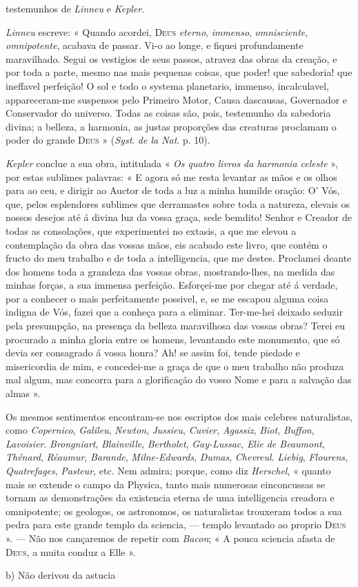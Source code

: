 testemunhos de \emph{Linneu} e \emph{Kepler}.\par \emph{Linneu} escreve: « Quando acordei, \textsc{Deus} \emph{eterno}, \emph{immenso}, \emph{omnisciente}, \emph{omnipotente}, acabava de passar. Vi-o ao longe, e fiquei profundamente maravilhado. Segui os vestigios de seus passos, atravez das obras da creação, e por toda a parte, mesmo nas mais pequenas coisas, que poder! que sabedoria! que ineffavel perfeição! O sol e todo o systema planetario, immenso, incalculavel, appareceram-me suspensos pelo Primeiro Motor, Causa dascausas, Governador e Conservador do universo. Todas as coisas são, pois, testemunho da sabedoria divina; a belleza, a harmonia, as justas proporções das creaturas proclamam o poder do grande \textsc{Deus} » (\emph{Syst}. \emph{de la Nat}. p. 10).\par \emph{Kepler} conclue a sua obra, intitulada « \emph{Os quatro livros da harmonia celeste} », por estas sublimes palavras: « E agora só me resta levantar as mãos e os olhos para ao ceu, e dirigir ao Auctor de toda a luz a minha humilde oração: O' Vós, que, pelos esplendores sublimes que derramastes sobre toda a natureza, elevais os nossos desejos até á divina luz da vossa graça, sede bemdito! Senhor e Creador de todas as consolações, que experimentei no extasis, a que me elevou a contemplação da obra das vossas mãos, eis acabado este livro, que contém o fructo do meu trabalho e de toda a intelligencia, que me destes. Proclamei deante dos homens toda a grandeza das vossas obras, mostrando-lhes, na medida das minhas forças, a sua immensa perfeição. Esforçei-me por chegar até á verdade, por a conhecer o mais perfeitamente possivel, e, se me escapou alguma coisa indigna de Vós, fazei que a conheça para a eliminar. Ter-me-hei deixado seduzir pela presumpção, na presença da belleza maravilhosa das vossas obras? Terei eu procurado a minha gloria entre os homens, levantando este monumento, que só devia ser consagrado á vossa honra? Ah! se assim foi, tende piedade e misericordia de mim, e concedei-me a graça de que o meu trabalho não produza mal algum, mas concorra para a glorificação do vosso Nome e para a salvação das almas ».\par Os mesmos sentimentos encontram-se nos escriptos dos mais celebres naturalistas, como \emph{Copernico}, \emph{Galileu}, \emph{Newton}, \emph{Jussieu}, \emph{Cuvier}, \emph{Agassiz}, \emph{Biot}, \emph{Buffon}, \emph{Lavoisier}. \emph{Brongniart}, \emph{Blainville}, \emph{Bertholet}, \emph{Gay-Lussac}, \emph{Elie de Beaumont}, \emph{Thénard}, \emph{Réaumur}, \emph{Barande}, \emph{Milne-Edwards}, \emph{Dumas}, \emph{Chevreul}. \emph{Liebig}, \emph{Flourens}, \emph{Quatrefages}, \emph{Pasteur}, etc. Nem admira; porque, como diz \emph{Herschel}, « quanto mais se extende o campo da Physica, tanto mais numerosas einconcussas se tornam as demonstrações da existencia eterna de uma intelligencia creadora e omnipotente; os geologos, os astronomos, os naturalistas trouxeram todos a sua pedra para este grande templo da sciencia, --- templo levantado ao proprio \textsc{Deus} ». --- Não nos cançaremos de repetir com \emph{Bacon}; « A pouca sciencia afasta de \textsc{Deus}, a muita conduz a Elle ».\par b) Não derivou da astucia 